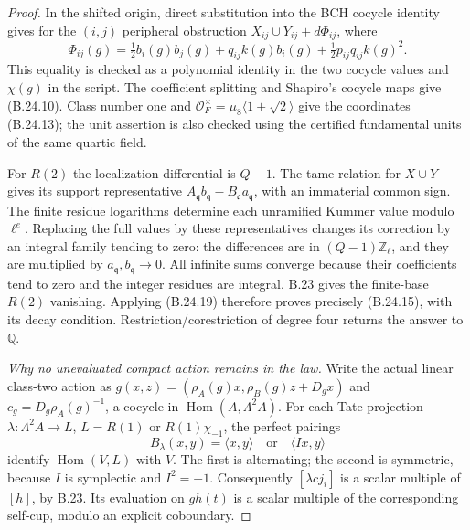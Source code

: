 \begin{proof}
In the shifted origin, direct substitution into the BCH
cocycle identity gives for the $(i,j)$ peripheral
obstruction
$X_{ij}\cup Y_{ij}+d\Phi_{ij}$, where
\[
 \Phi_{ij}(g)=
 \tfrac12 b_i(g)b_j(g)+q_{ij}k(g)b_i(g)
                 +\tfrac12 p_{ij}q_{ij}k(g)^2.
                                                               \tag{B.24.23}
\]
This equality is checked as a polynomial identity in
the two cocycle values and $\chi(g)$ in the script.
The coefficient splitting and Shapiro's cocycle maps
give (B.24.10). Class number one and
$\mathcal O_F^\times=\mu_8\langle1+\sqrt2\rangle$
give the coordinates (B.24.13); the unit assertion
is also checked using the certified fundamental
units of the same quartic field.

For $R(2)$ the localization differential is $Q-1$.
The tame relation for $X\cup Y$ gives its support
representative
$A_{\mathfrak q}b_{\mathfrak q}
 -B_{\mathfrak q}a_{\mathfrak q}$, with an immaterial
common sign. The finite residue logarithms determine
each unramified Kummer value modulo $\ell^e$.
Replacing the full values by these representatives
changes its correction by an integral family tending
to zero: the differences are in
$(Q-1)\mathbb Z_\ell$, and they are multiplied by
$a_{\mathfrak q},b_{\mathfrak q}\to0$.
All infinite sums converge because their coefficients
tend to zero and the integer residues are integral.
B.23 gives the finite-base $R(2)$ vanishing. Applying
(B.24.19) therefore proves precisely (B.24.15), with
its decay condition. Restriction/corestriction of
degree four returns the answer to $\mathbb Q$.

\emph{Why no unevaluated compact action remains in the law.}
Write the actual linear class-two action as
$g(x,z)=(\rho_A(g)x,\rho_B(g)z+D_gx)$ and
$c_g=D_g\rho_A(g)^{-1}$, a cocycle in
$\operatorname{Hom}(A,\Lambda^2A)$.
For each Tate projection
$\lambda:\Lambda^2A\to L$, $L=R(1)$ or
$R(1)\chi_{-1}$, the perfect pairings
\[
 B_\lambda(x,y)=\langle x,y\rangle
       \quad\text{or}\quad \langle Ix,y\rangle
                                                               \tag{B.24.24}
\]
identify $\operatorname{Hom}(V,L)$ with $V$.
The first is alternating; the second is symmetric,
because $I$ is symplectic and $I^2=-1$.
Consequently $[\lambda c j_i]$ is a scalar multiple
of $[h]$, by B.23. Its evaluation on $g h(t)$ is a
scalar multiple of the corresponding self-cup, modulo
an explicit coboundary.


\end{proof}
